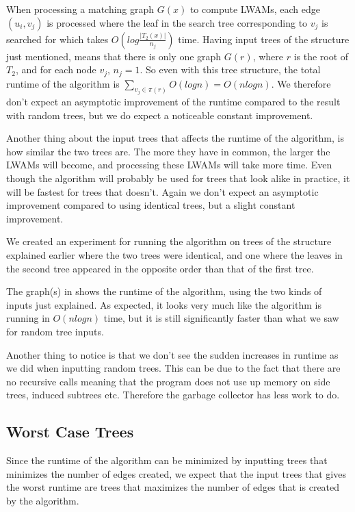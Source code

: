 When processing a matching graph $G(x)$ to compute LWAMs, each edge $(u_i, v_j)$ is processed where the leaf in the search tree corresponding to $v_j$ is searched for which takes $O(log\frac{|T_2(x)|}{n_j})$ time. Having input trees of the structure just mentioned, means that there is only one graph $G(r)$, where $r$ is the root of $T_2$, and for each node $v_j$, $n_j = 1$. So even with this tree structure, the total runtime of the algorithm is $\sum_{v_j \in \pi(r)} O(log n) = O(nlogn)$. We therefore don't expect an asymptotic improvement of the runtime compared to the result with random trees, but we do expect a noticeable constant improvement.

Another thing about the input trees that affects the runtime of the algorithm, is how similar the two trees are. The more they have in common, the larger the LWAMs will become, and processing these LWAMs will take more time. Even though the algorithm will probably be used for trees that look alike in practice, it will be fastest for trees that doesn't. Again we don't expect an asymptotic improvement compared to using identical trees, but a slight constant improvement.

We created an experiment for running the algorithm on trees of the structure explained earlier where the two trees were identical, and one where the leaves in the second tree appeared in the opposite order than that of the first tree.

The graph(s) in  shows the runtime of the algorithm, using the two kinds of inputs just explained. As expected, it looks very much like the algorithm is running in $O(nlogn)$ time, but it is still significantly faster than what we saw for random tree inputs. 

Another thing to notice is that we don't see the sudden increases in runtime as we did when inputting random trees. This can be due to the fact that there are no recursive calls meaning that the program does not use up memory on side trees, induced subtrees etc. Therefore the garbage collector has less work to do.


\subsection{Worst Case Trees}
Since the runtime of the algorithm can be minimized by inputting trees that minimizes the number of edges created, we expect that the input trees that gives the worst runtime are trees that maximizes the number of edges that is created by the algorithm.


